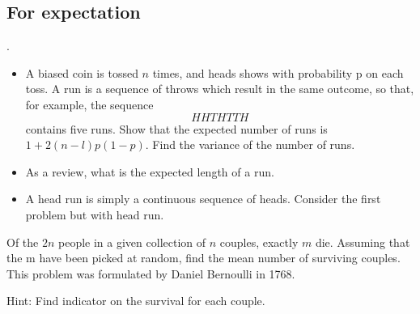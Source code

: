 \subsection{For expectation}
\begin{eg}.\\
   \begin{itemize}
       \item A biased coin is tossed \(n\)  times, and heads shows with probability p on each toss. A run is a
sequence of throws which result in the same outcome, so that, for example, the sequence 
\[
HHTHTTH
\]    
contains five runs. Show that the expected number of runs is \(1 + 2(n - l)p(1 - p) \). Find the variance
of the number of runs. 
        \item As a review, what is the expected length of a run. 
        \item A head run is simply a continuous sequence of heads. Consider the first problem but with head run.
   \end{itemize} 
\end{eg}
\begin{exercise}
    Of the \(2n\)  people in a given collection of \(n\)  couples, exactly \(m\)  die. Assuming that the m have
been picked at random, find the mean number of surviving couples. This problem was formulated by
Daniel Bernoulli in 1768.\\
\end{exercise}
Hint: Find indicator on the survival for each couple.

